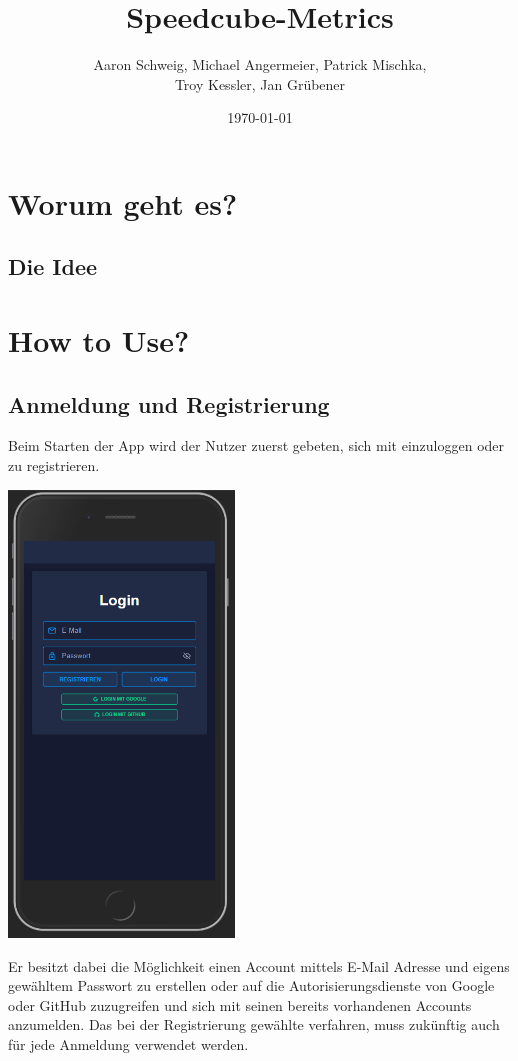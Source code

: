 \documentclass[a4paper]{article}
\title{Speedcube-Metrics}
\author{Aaron Schweig, Michael Angermeier, Patrick Mischka, \\ Troy Kessler, Jan Grübener}
\date{{\today}}
\begin{document}
	\maketitle
	\section{Worum geht es?}
	\subsection{Die Idee}
	\section{How to Use?}
	\subsection*{Anmeldung und Registrierung}
	Beim Starten der App wird der Nutzer zuerst gebeten, sich mit einzuloggen oder zu registrieren. 
	\begin{center}
		\includegraphics[width= 6cm, keepaspectratio]{img/login}
	\end{center}
	Er besitzt dabei die Möglichkeit einen Account mittels E-Mail Adresse und eigens gewähltem Passwort zu erstellen oder auf die Autorisierungsdienste von Google oder GitHub zuzugreifen und sich mit seinen bereits vorhandenen Accounts anzumelden. Das bei der Registrierung gewählte verfahren, muss zukünftig auch für jede Anmeldung verwendet werden.
\end{document}

